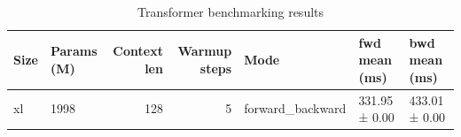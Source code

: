 \begin{table}
\caption{Transformer benchmarking results}
\label{tab:benchmarks}
\begin{tabular}{llrrlll}
\toprule
Size & Params (M) & Context len & Warmup steps & Mode & fwd mean (ms) & bwd mean (ms) \\
\midrule
xl & 1998 & 128 & 5 & forward_backward & 331.95 ± 0.00 & 433.01 ± 0.00 \\
\bottomrule
\end{tabular}
\end{table}
